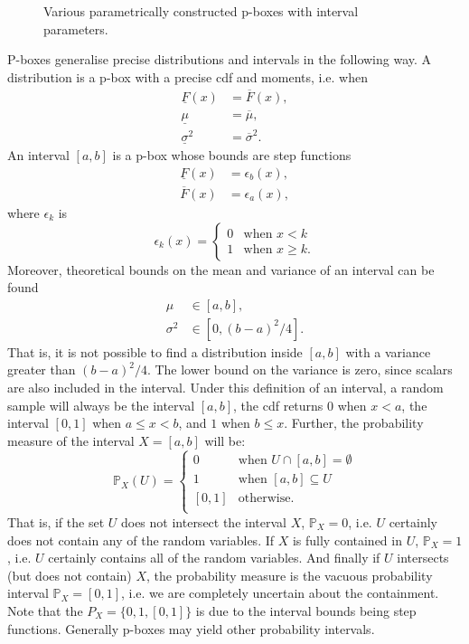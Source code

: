 \documentclass{juliacon}
\begin{document}
\begin{figure}[htp]
  \caption{Various parametrically constructed p-boxes with interval parameters.}
  \label{fig:figure3}
\end{figure}
P-boxes generalise precise distributions and intervals in the following way. A distribution is a p-box with a precise cdf and moments, i.e. when
\begin{align*}
  \underline{F}(x) &= \overline{F}(x), \\ 
  \underline{\mu}  &= \overline{\mu}, \\ 
  \underline{\sigma}^2 &= \overline{\sigma}^2 .
\end{align*}
\noindent An interval $[a,b]$ is a p-box whose bounds are step functions
\begin{align*}
    \underline{F}(x) &= \epsilon_{b}(x) ,\\
    \overline{F}(x) &= \epsilon_{a}(x) ,
\end{align*}
\noindent where $\epsilon_k$ is
\begin{equation*}
   \epsilon_k(x) = \begin{cases} 0 &\text{when } x < k \\ 1 &\text{when } x \geq k. \end{cases} 
\end{equation*}
\noindent Moreover, theoretical bounds on the mean and variance of an interval can be found~\cite{ferson2002ramas}
\begin{align*}
  \mu &\in [a, b], \\
  \sigma^2 &\in [0, (b - a)^{2}/4].
\end{align*}
\noindent That is, it is not possible to find a distribution inside $[a, b]$ with a variance greater than $(b-a)^{2}/4$. The lower bound on the variance is zero, since scalars are also included in the interval. Under this definition of an interval, a random sample will always be the interval $[a, b]$, the cdf returns 0 when $x < a$, the interval $[0,1]$ when $a \leq x < b$, and $1$ when $b \leq x$. Further, the probability measure of the interval $X = [a, b]$ will be: 
\begin{equation*}
  \mathbb{P}_{X}(U) = \begin{cases}
    0 & \text{when } U \cap [a,b] = \emptyset \\
    1 & \text{when } [a,b] \subseteq U  \\
    [0, 1] & \text{otherwise.}\\
  \end{cases}
\end{equation*}
\noindent That is, if the set $U$ does not intersect the interval $X$, $\mathbb{P}_{X}=0$, i.e. $U$ certainly does not contain any of the random variables. If $X$ is fully contained in $U$, $\mathbb{P}_{X}=1$, i.e. $U$ certainly contains all of the random variables. And finally if $U$ intersects (but does not contain) $X$, the probability measure is the vacuous probability interval $\mathbb{P}_{X} = [0, 1]$, i.e. we are completely uncertain about the containment. Note that the $P_{X} = \{0, 1, [0,1]\}$ is due to the interval bounds being step functions. Generally p-boxes may yield other probability intervals.
\end{document}
